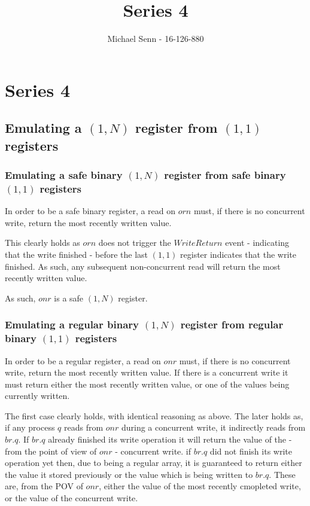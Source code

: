 \documentclass[a4paper]{scrreprt}
\title{Series 4}
\author{Michael Senn \maillink{michael.senn@students.unibe.ch} - 16-126-880}
\date{\printdate}
\begin{document}
\maketitle


\setcounter{chapter}{3}

\chapter{Series 4}

\section{Emulating a $(1, N)$ register from $(1, 1)$ registers}

\subsection{Emulating a safe binary $(1, N)$ register from safe binary $(1, 1)$ registers}

In order to be a safe binary register, a read on $orn$ must, if there is no
concurrent write, return the most recently written value. 

This clearly holds as $orn$ does not trigger the $WriteReturn$ event -
indicating that the write finished - before the last $(1, 1)$ register
indicates that the write finished. As such, any subsequent non-concurrent read
will return the most recently written value.

As such, $onr$ is a safe $(1, N)$ register.

\subsection{Emulating a regular binary $(1, N)$ register from regular binary $(1, 1)$ registers}
\label{seq:regular_binary_register}

In order to be a regular register, a read on $onr$ must, if there is no
concurrent write, return the most recently written value. If there is a
concurrent write it must return either the most recently written value, or one
of the values being currently written.

The first case clearly holds, with identical reasoning as above. The later
holds as, if any process $q$ reads from $onr$ during a concurrent write, it
indirectly reads from $br.q$. If $br.q$ already finished its write operation it
will return the value of the - from the point of view of $onr$ - concurrent
write. if $br.q$ did not finish its write operation yet then, due to being a
regular array, it is guaranteed to return either the value it stored previously
or the value which is being written to $br.q$. These are, from the POV of
$onr$, either the value of the most recently cmopleted write, or the value of
the concurrent write.
\end{document}
